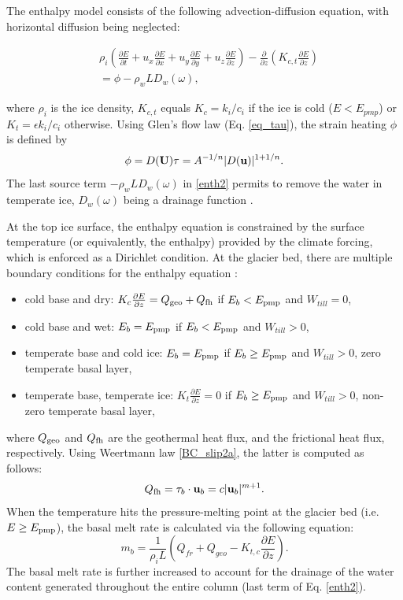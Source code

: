 \documentclass[10pt,twocolumn]{article}
\begin{document}
The enthalpy model consists of the following advection-diffusion equation,
with horizontal diffusion being neglected:

\begin{align}
& \rho_i \left( \frac{\partial E}{ \partial t}
+ u_x \frac{\partial E}{ \partial x}
+ u_y \frac{\partial E}{ \partial y} 
+ u_z \frac{\partial E}{ \partial z} 
\right) 
 - \frac{\partial }{\partial z} \left(
K_{c,t} \frac{\partial E}{ \partial z} \right) \label{enth1} \\
& = \phi - \rho_w L D_w(\omega), \label{enth2} 
\end{align}

where $\rho_i$ is the ice density, $K_{c,t}$ equals 
$K_c = k_i/c_i$ if the ice is cold ($E<E_{pmp}$) or $K_t = \epsilon k_i/c_i$ otherwise. 
Using Glen's flow law (Eq. \eqref{eq_tau}), the strain heating $\phi$ is defined by 
\begin{equation}
\label{def_phi}
\phi = D({\bf U}) \tau = A^{-1/n} | D({\bf u}) |^{1+1/n}.
\end{equation}
The last source term $- \rho_w L D_w(\omega)$ in \eqref{enth2} permits to remove the water 
in temperate ice, $D_w(\omega)$ being a drainage function \citep{aschwanden2012enthalpy}.

At the top ice surface, the enthalpy equation is constrained by the surface temperature 
(or equivalently, the enthalpy) provided by the climate forcing, which is enforced as a 
Dirichlet condition.
At the glacier bed, there are multiple boundary conditions for the enthalpy equation
\citep{aschwanden2012enthalpy,wang2020two}:
\begin{itemize}
\item cold base and dry: $K_{c} \frac{\partial E}{ \partial z} = Q_{\rm geo} + Q_{\rm fh}$
if $E_b<E_{\rm pmp}$ and $W_{till} = 0$, 
\item cold base and wet: $ E_b = E_{\rm pmp} $ if $E_b<E_{\rm pmp}$ and $W_{till} > 0$,
\item temperate base and cold ice: $ E_b = E_{\rm pmp} $ if $E_b \ge E_{\rm pmp}$ and $W_{till}> 0$,
zero temperate basal layer,
\item temperate base, temperate ice: $ K_{t} \frac{\partial E}{ \partial z} = 0$ 
if $E_b \ge E_{\rm pmp}$ and $W_{till} > 0$, non-zero temperate basal layer,
\end{itemize}
where $Q_{\rm geo}$ and $Q_{\rm fh}$ are the geothermal heat flux, and the frictional heat flux, 
respectively. Using Weertmann law \eqref{BC_slip2a}, the latter is computed as follows:
\begin{equation}
Q_{\rm fh} = \tau_b \cdot {\bf u}_b = c | {\bf u}_b |^{m+1}. \label{def_Q}
\end{equation}
When the temperature hits the pressure-melting point at the glacier bed 
(i.e. $E \ge E_{\rm pmp}$), the basal melt rate is calculated via the following equation:
\begin{equation}
m_b = \frac{1}{\rho_i L} (Q_{fr}+Q_{geo} - K_{t,c} \frac{\partial E}{ \partial z}). 
\label{basal_melt_rate}
\end{equation}
The basal melt rate is further increased to account for the drainage of the water 
content generated throughout the entire column (last term of Eq. \eqref{enth2}).
\end{document}
